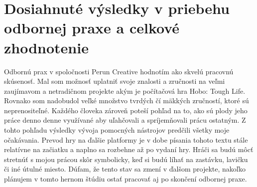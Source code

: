 \documentclass[slovak, bachelorpractice]{diploma}
\begin{document}
\section{Dosiahnuté výsledky v priebehu odbornej praxe a celkové zhodnotenie}
\label{sec:Results}
Odbornú prax v spoločnosti Perun Creative hodnotím ako skvelú pracovnú skúsenosť. Mal som možnosť uplatniť svoje znalosti a zručnosti na veľmi zaujímavom a netradičnom projekte akým je počítačová hra Hobo: Tough Life. Rovnako som nadobudol veľké množstvo tvrdých čí mäkkých zručností, ktoré sú neprenositeľné. Každého človeka zároveň poteší pohľad na to, ako sú plody jeho práce denno denne využívané aby uľahčovali a spríjemňovali prácu ostatným. Z tohto pohľadu výsledky vývoja pomocných nástrojov predčili všetky moje očakávania. Prevod hry na ďalšie platformy je v dobe písania tohoto textu stále relatívne na začiatku a naplno sa rozbehne až po vydaní hry. Hráči sa budú môcť stretnúť s mojou prácou skôr symbolicky, keď si budú líhať na zastávku, lavičku či iné útulné miesto. Dúfam, že tento stav sa zmení v ďalšom projekte, nakoľko plánujem v tomto hernom štúdiu ostať pracovať aj po skončení odbornej praxe.

\printbibliography[title={Literatúra}, heading=bibintoc]

%
\end{document}
